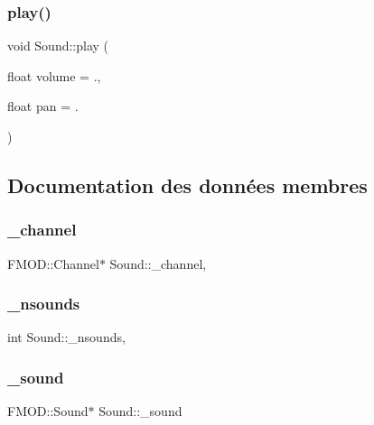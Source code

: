 \subsubsection{\texorpdfstring{play()}{play()}}
{\footnotesize\ttfamily void Sound\+::play (\begin{DoxyParamCaption}\item[{float}]{volume = {.},  }\item[{float}]{pan = {.} }\end{DoxyParamCaption})}



\subsection{Documentation des données membres}
\mbox{\label{classSound_abec2496805fd3f24b0b88f5d3c00128b}} 
\subsubsection{\texorpdfstring{\+\_\+channel}{\_channel}}
{\footnotesize\ttfamily F\+M\+O\+D\+::\+Channel$\ast$ Sound\+::\+\_\+channel\hspace{0.3cm}{\ttfamily [static]}, {\ttfamily [private]}}

\mbox{\label{classSound_ae6fb5417aee48d6f9a46a930b967accb}} 
\subsubsection{\texorpdfstring{\+\_\+nsounds}{\_nsounds}}
{\footnotesize\ttfamily int Sound\+::\+\_\+nsounds\hspace{0.3cm}{\ttfamily [static]}, {\ttfamily [private]}}

\mbox{\label{classSound_a4ebe6d9fd4b5d06957125f515190ac27}} 
\subsubsection{\texorpdfstring{\+\_\+sound}{\_sound}}
{\footnotesize\ttfamily F\+M\+O\+D\+::\+Sound$\ast$ Sound\+::\+\_\+sound\hspace{0.3cm}{\ttfamily [private]}}

